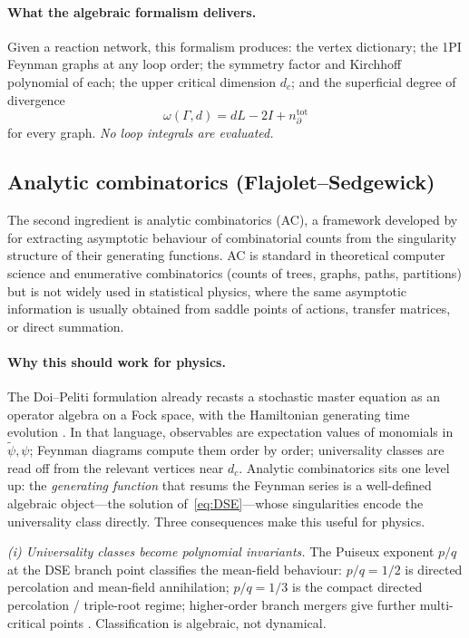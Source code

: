 \documentclass[11pt,a4paper]{article}
\newcommand{\psit}{\tilde\psi}
\theoremstyle{plain}
\begin{document}
\paragraph{What the algebraic formalism delivers.}
Given a reaction network, this formalism produces: the vertex
dictionary; the 1PI Feynman graphs at any loop order; the
symmetry factor and Kirchhoff polynomial of each; the upper
critical dimension $d_c$; and the superficial degree of
divergence
\begin{equation}\label{eq:omega}
  \omega(\Gamma, d) = dL - 2I + n_\partial^{\mathrm{tot}}
\end{equation}
for every graph.  \emph{No loop integrals are evaluated.}

\subsection{Analytic combinatorics (Flajolet--Sedgewick)}
\label{sec:ac}

The second ingredient is analytic combinatorics (AC), a framework
developed by \citet{FlajoletSedgewick} for extracting asymptotic
behaviour of combinatorial counts from the singularity structure
of their generating functions.  AC is standard in theoretical
computer science and enumerative combinatorics (counts of trees,
graphs, paths, partitions) but is not widely used in statistical
physics, where the same asymptotic information is usually obtained
from saddle points of actions, transfer matrices, or direct
summation.

\paragraph{Why this should work for physics.}
The Doi--Peliti formulation already recasts a stochastic master
equation as an operator algebra on a Fock space, with the
Hamiltonian generating time evolution
\citep{Doi1976,Peliti1985,Tauber}.  In that language, observables
are expectation values of monomials in $\psit, \psi$; Feynman
diagrams compute them order by order; universality classes are
read off from the relevant vertices near $d_c$.  Analytic
combinatorics sits one level up: the \emph{generating function}
that resums the Feynman series is a well-defined algebraic
object---the solution of~\eqref{eq:DSE}---whose singularities
encode the universality class directly.  Three consequences
make this useful for physics.

\emph{(i) Universality classes become polynomial invariants.}
The Puiseux exponent $p/q$ at the DSE branch point classifies the
mean-field behaviour: $p/q = 1/2$ is directed percolation and
mean-field annihilation; $p/q = 1/3$ is the compact directed
percolation / triple-root regime; higher-order branch mergers
give further multi-critical points
\citep{FlajoletSedgewick,Amarteifio2019Thesis,AmarteifioBRW}.
Classification is algebraic, not dynamical.
\end{document}
